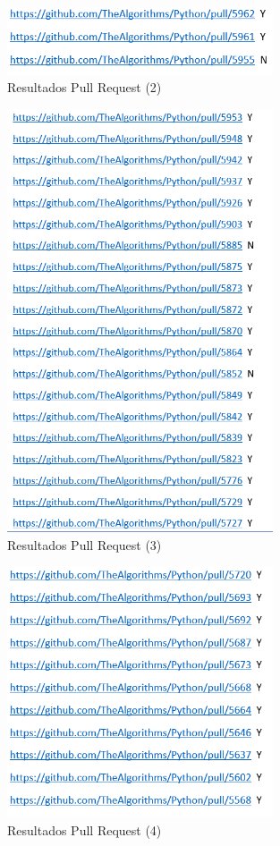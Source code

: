 \documentclass[a4paper, 12pt]{book}
\begin{document}
\begin{figure}
	\centering
    \includegraphics[width=0.7\textwidth]{img/git6}
    \caption{Resultados Pull Request (2)}
 \end{figure}
 
\begin{figure}
	\centering
    \includegraphics[width=0.7\textwidth]{img/git7}
    \caption{Resultados Pull Request (3)}
 \end{figure}
 
\begin{figure}
	\centering
    \includegraphics[width=0.7\textwidth]{img/git8}
    \caption{Resultados Pull Request (4)}
 \end{figure}
 
\end{document}
